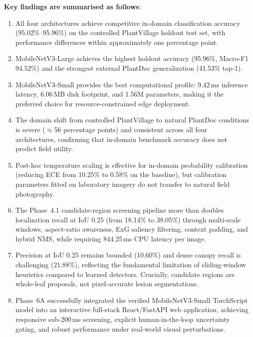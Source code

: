 \documentclass[pdflatex,sn-mathphys-num]{sn-jnl}
\theoremstyle{thmstyleone}%
\theoremstyle{thmstyletwo}%
\theoremstyle{thmstylethree}%
\begin{document}
\textbf{Key findings are summarised as follows}:
\begin{enumerate}
  \item All four architectures achieve competitive in-domain classification accuracy (95.02\%--95.96\%) on the controlled PlantVillage holdout test set, with performance differences within approximately one percentage point.
  \item MobileNetV3-Large achieves the highest holdout accuracy (95.96\%, Macro-F1 94.52\%) and the strongest external PlantDoc generalization (41.53\% top-1).
  \item MobileNetV3-Small provides the best computational profile: 9.42\,ms inference latency, 6.06\,MB disk footprint, and 1.56M parameters, making it the preferred choice for resource-constrained edge deployment.
  \item The domain shift from controlled PlantVillage to natural PlantDoc conditions is severe ($\approx$56 percentage points) and consistent across all four architectures, confirming that in-domain benchmark accuracy does not predict field utility.
  \item Post-hoc temperature scaling is effective for in-domain probability calibration (reducing ECE from 10.25\% to 0.58\% on the baseline), but calibration parameters fitted on laboratory imagery do not transfer to natural field photography.
  \item The Phase~4.1 candidate-region screening pipeline more than doubles localization recall at IoU 0.25 (from 18.14\% to 38.05\%) through multi-scale windows, aspect-ratio awareness, ExG saliency filtering, context padding, and hybrid NMS, while requiring 844.25\,ms CPU latency per image.
  \item Precision at IoU 0.25 remains bounded (10.60\%) and dense canopy recall is challenging (21.88\%), reflecting the fundamental limitation of sliding-window heuristics compared to learned detectors. Crucially, candidate regions are whole-leaf proposals, not pixel-accurate lesion segmentations.
  \item Phase~6A successfully integrated the verified MobileNetV3-Small TorchScript model into an interactive full-stack React/FastAPI web application, achieving responsive sub-200\,ms screening, explicit human-in-the-loop uncertainty gating, and robust performance under real-world visual perturbations.
\end{enumerate}
\end{document}
